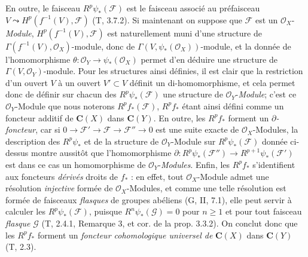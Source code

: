 \begin{env}[12.2.1]
En outre, le faisceau $R^p\psi_*(\mathcal F)$ est le faisceau associé au
préfaisceau $V\leadsto H^p(f^{-1}(V),\mathcal F)$ (T, 3.7.2). Si maintenant
on suppose que $\mathcal F$ est un $\mathcal O_X$-\emph{Module},
$H^p(f^{-1}(V),\mathcal F)$ est naturellement muni d'une structure de
$\Gamma(f^{-1}(V),\mathcal O_X)$-module, donc de
$\Gamma(V,\psi_*(\mathcal O_X))$-module, et la donnée de l'homomorphisme
$\theta:\mathcal O_Y\to\psi_*(\mathcal O_X)$ permet d'en déduire une
structure de $\Gamma(V,\mathcal O_Y)$-module. Pour les structures ainsi
définies, il est clair que la restriction d'un ouvert $V$ à un ouvert
$V'\subset V$ définit un di-homomorphisme, et cela permet donc de définir sur
chacun des $R^p\psi_*(\mathcal F)$ une structure de $\mathcal O_Y$-\emph{Module};
c'est ce $\mathcal O_Y$-Module que nous noterons $R^p f_*(\mathcal F)$,
$R^p f_*$ étant ainsi défini comme un foncteur additif de $\boldsymbol{C}(X)$ dans
$\boldsymbol{C}(Y)$. En outre, les $R^p f_*$ forment un \emph{$\partial$-foncteur}, car si
$0\longrightarrow\mathcal F'\longrightarrow\mathcal F
\longrightarrow\mathcal F''\longrightarrow0$
est une suite exacte de $\mathcal O_X$-Modules, la description des
$R^p\psi_*$ et de la structure de $\mathcal O_Y$-Module sur
$R^p\psi_*(\mathcal F)$ donnée ci-dessus montre aussitôt que
l'homomorphisme
$\partial:R^p\psi_*(\mathcal F'')\longrightarrow
R^{p+1}\psi_*(\mathcal F')$
est dans ce cas un homomorphisme de $\mathcal O_Y$-\emph{Modules}. Enfin, les
$R^p f_*$ s'identifient aux foncteurs \emph{dérivés} droits de $f_*$ : en effet,
tout $\mathcal O_X$-Module admet une résolution \emph{injective} formée de
$\mathcal O_X$-Modules, et comme une telle résolution est formée de faisceaux
\emph{flasques} de groupes abéliens (G, II, 7.1), elle peut servir à calculer les
$R^p\psi_*(\mathcal F)$, puisque $R^n\psi_*(\mathcal G)=0$ pour $n\geq1$ et
pour tout faisceau \emph{flasque} $\mathcal G$ (T, 2.4.1, Remarque 3, et cor. de la
prop. 3.3.2). On conclut donc que les $R^p f_*$ forment un \emph{foncteur
cohomologique universel de} $\boldsymbol{C}(X)$ dans $\boldsymbol{C}(Y)$ (T, 2.3).
\end{env}

